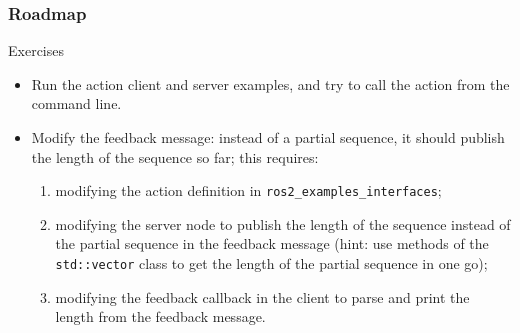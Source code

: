 \documentclass[aspectratio=169]{beamer}
\begin{document}
\frame{\titlepage}



\begin{frame}
	\frametitle{Roadmap}
	\tableofcontents
\end{frame}



\begin{frame}{Exercises}
  \justifying
	\begin{itemize}
		\item Run the action client and server examples, and try to call the action from the command line.
		\item Modify the feedback message: instead of a partial sequence, it should publish the length of the sequence so far; this requires:
		      \begin{enumerate}
			      \item modifying the action definition in \texttt{ros2\_examples\_interfaces};
			      \item modifying the server node to publish the length of the sequence instead of the partial sequence in the feedback message (hint: use methods of the \texttt{std::vector} class to get the length of the partial sequence in one go);
			      \item modifying the feedback callback in the client to parse and print the length from the feedback message.
		      \end{enumerate}
	\end{itemize}
\end{frame}
\end{document}

